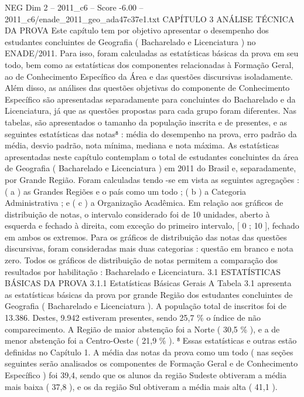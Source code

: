 \begin{textsample}{NEG Dim 2 – 2011\_c6 – Score -6.00 – 2011\_c6/enade\_2011\_geo\_ada47c37e1.txt}  \label{ex:f2_neg_021}
CAPÍTULO 3 ANÁLISE TÉCNICA DA PROVA Este capítulo tem por objetivo apresentar o desempenho dos estudantes concluintes de Geografia ( Bacharelado e Licenciatura ) no ENADE/2011.
Para isso, foram calculadas as estatísticas básicas da prova em seu todo, bem como as estatísticas dos componentes relacionadas à Formação Geral, ao de Conhecimento Específico da Área e das questões discursivas isoladamente.
Além disso, as análises das questões objetivas do componente de Conhecimento Específico são apresentadas separadamente para concluintes do Bacharelado e da Licenciatura, já que as questões propostas para cada grupo foram diferentes.
Nas tabelas, são apresentados o tamanho da população inscrita e de presentes, e as seguintes estatísticas das notas⁸ : média do desempenho na prova, erro padrão da média, desvio padrão, nota mínima, mediana e nota máxima.
As estatísticas apresentadas neste capítulo contemplam o total de estudantes concluintes da área de Geografia ( Bacharelado e Licenciatura ) em 2011 do Brasil e, separadamente, por Grande Região.
Foram calculadas tendo -se em vista as seguintes agregações : ( a ) as Grandes Regiões e o país como um todo ; ( b ) a Categoria Administrativa ; e ( c ) a Organização Acadêmica.
Em relação aos gráficos de distribuição de notas, o intervalo considerado foi de 10 unidades, aberto à esquerda e fechado à direita, com exceção do primeiro intervalo, [ 0 ; 10 ], fechado em ambos os extremos.
Para os gráficos de distribuição das notas das questões discursivas, foram consideradas mais duas categorias : questão em branco e nota zero.
Todos os gráficos de distribuição de notas permitem a comparação dos resultados por habilitação : Bacharelado e Licenciatura. 3.1 ESTATÍSTICAS BÁSICAS DA PROVA 3.1.1 Estatísticas Básicas Gerais A Tabela 3.1 apresenta as estatísticas básicas da prova por grande Região dos estudantes concluintes de Geografia ( Bacharelado e Licenciatura ).
A população total de inscritos foi de 13.386.
Destes, 9.942 estiveram presentes, sendo 25,7 \% o índice de não comparecimento.
A Região de maior abstenção foi a Norte ( 30,5 \% ), e a de menor abstenção foi a Centro-Oeste ( 21,9 \% ). ⁸ Essas estatísticas e outras estão definidas no Capítulo 1.
A média das notas da prova como um todo ( nas seções seguintes serão analisados os componentes de Formação Geral e de Conhecimento Específico ) foi 39,4, sendo que os alunos da região Sudeste obtiveram a média mais baixa ( 37,8 ), e os da região Sul obtiveram a média mais alta ( 41,1 ).

\end{textsample}
